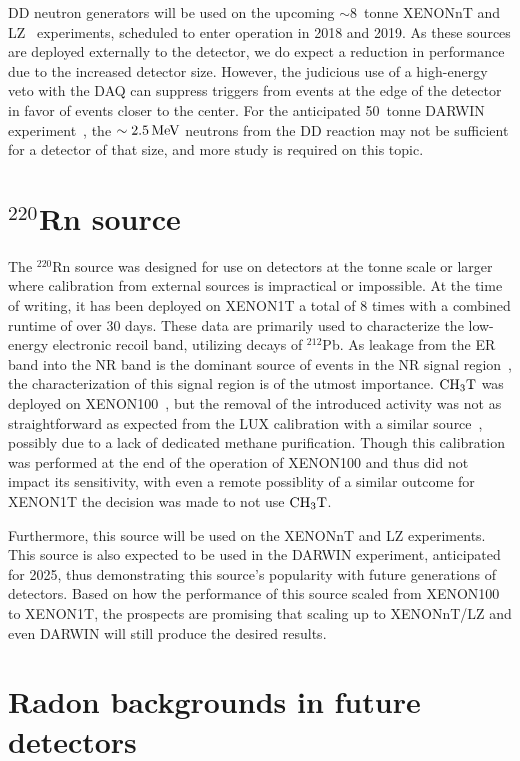 DD neutron generators will be used on the upcoming $\sim8$~tonne XENONnT and LZ~\cite{Akerib:2018lyp,Mount:2017qzi} experiments, scheduled to enter operation in 2018 and 2019. As these sources are deployed externally to the detector, we do expect a reduction in performance due to the increased detector size. However, the judicious use of a high-energy veto with the DAQ can suppress triggers from events at the edge of the detector in favor of events closer to the center. For the anticipated 50~tonne DARWIN experiment~\cite{Aalbers:2016jon}, the $\sim2.5\,\mathrm{MeV}$ neutrons from the DD reaction may not be sufficient for a detector of that size, and more study is required on this topic.

\section{$^{220}$Rn source}

The $^{220}$Rn source was designed for use on detectors at the tonne scale or larger where calibration from external sources is impractical or impossible. At the time of writing, it has been deployed on XENON1T a total of 8 times with a combined runtime of over 30 days. These data are primarily used to characterize the low-energy electronic recoil band, utilizing decays of $^{212}$Pb. As leakage from the ER band into the NR band is the dominant source of events in the NR signal region~\cite{Aprile:2015uzo}, the characterization of this signal region is of the utmost importance. $\mathrm{CH_3T}$ was deployed on XENON100~\cite{Aprile:2017xxh}, but the removal of the introduced activity was not as straightforward as expected from the LUX calibration with a similar source~\cite{Akerib:2015wdi}, possibly due to a lack of dedicated methane purification. Though this calibration was performed at the end of the operation of XENON100 and thus did not impact its sensitivity, with even a remote possiblity of a similar outcome for XENON1T the decision was made to not use $\mathrm{CH_3T}$.

Furthermore, this source will be used on the XENONnT and LZ experiments. This source is also expected to be used in the DARWIN experiment, anticipated for 2025, thus demonstrating this source's popularity with future generations of detectors. Based on how the performance of this source scaled from XENON100 to XENON1T, the prospects are promising that scaling up to XENONnT/LZ and even DARWIN will still produce the desired results.

\section{Radon backgrounds in future detectors}

